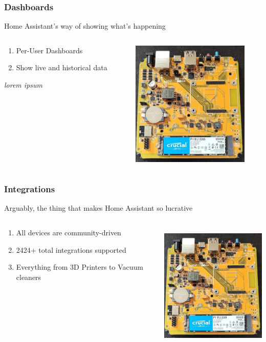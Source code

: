 \documentclass[aspectratio=169]{beamer}
\begin{document}
\begin{frame}[fragile]
  \frametitle{Dashboards}
  Home Assistant's way of showing what's happening
  \vfill
  \begin{columns}[]
    \begin{column}[T]{0.45\paperwidth}
      \begin{enumerate}%
        \item{Per-User Dashboards}
        \item{Show live and historical data}
      \end{enumerate}
      \emph{lorem ipsum}
    \end{column}
    \begin{column}[T]{0.45\paperwidth}
      \includegraphics[height=6cm,keepaspectratio]{images/yellow.jpg}
    \end{column}
  \end{columns}
\end{frame}
\begin{frame}[fragile]
  \frametitle{Integrations}
  Arguably, the thing that makes Home Assistant so lucrative
  \vfill
  \begin{columns}[]
    \begin{column}[T]{0.45\paperwidth}
      \begin{enumerate}%
        \item{All devices are community-driven}
        \item{2424+ total integrations supported}
        \item{Everything from 3D Printers to Vacuum cleaners}
      \end{enumerate}
    \end{column}
    \begin{column}[T]{0.45\paperwidth}
      \includegraphics[height=6cm,keepaspectratio]{images/yellow.jpg}
    \end{column}
  \end{columns}
\end{frame}
\end{document}
